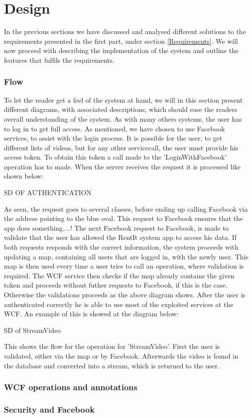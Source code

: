 \part{Design}
In the previous sections we have discussed and analysed different solutions to the requirements presented in the first part, under section \ref{Requirements}. We will now proceed with describing the implementation of the system and outline the features that fulfils the requirements.

\section{Flow}
To let the reader get a feel of the system at hand, we will in this section present different diagrams, with associated descriptions, which should ease the readers overall understanding of the system.
As with many others systems, the user has to log in to get full access. As mentioned, we have chosen to use Facebook services, to assist with the login process. It is possible for the user, to get different lists of videos, but for any other servicecall, the user must provide his access token. To obtain this token a call made to the 'LoginWithFacebook' operation has to made. When the server receives the request it is processed like shown below:

SD OF AUTHENTICATION

As seen, the request goes to several classes, before ending up calling Facebook via the address pointing to the blue oval. This request to Facebook ensures that the app does something....!
The next Facebook request to Facebook, is made to validate that the user has allowed the RentIt system app to access his data. If both requests responds with the correct information, the system proceeds with updating a map, containing all users that are logged in, with the newly user. This map is then used every time a user tries to call an operation, where validation is required. The WCF service then checks if the map already contains the given token and proceeds without futher requests to Facebook, if this is the case. Otherwise the validations proceeds as the above diagram shows. 
After the user is authenticated correctly he is able to use most of the exploited services at the WCF. An example of this is showed at the diagram below:

SD of StreamVideo

This shows the flow for the operation for 'StreamVideo'. First the user is validated, either via the map or by Facebook. Afterwards the video is found in the database and converted into a stream, which is returned to the user. 


\section{WCF operations and annotations}


\section{Security and Facebook}

